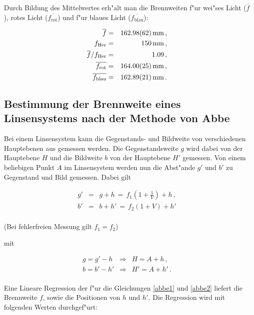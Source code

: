 		\clearpage

		Durch Bildung des Mittelwertes erh"alt man die Brennweiten f"ur wei"ses Licht ($\overline{f}$),
		rotes Licht ($\overline{f_\mathrm{rot}}$) und f"ur blaues Licht ($\overline{f_\mathrm{blau}}$):

		\begin{eqnarray*}
			\overline{f} & = & \SI{162.98 (62)}{\milli \meter} \, , \\
			f_\mathrm{Her} & = & \SI{150}{\milli \meter} \, , \\
			\overline{f}/f_\mathrm{Her} & = & \SI{1.09}{} \, , \\
			\overline{f_\mathrm{rot}} & = & \SI{164.00 (25)}{\milli \meter} \, , \\
			\overline{f_\mathrm{blau}} & = & \SI{162.89 (21)}{\milli \meter} \, .
		\end{eqnarray*}

	\subsection{Bestimmung der Brennweite eines Linsensystems nach der Methode von Abbe}
		\label{subsec:abbe}
		Bei einem Linsensystem kann die Gegenstands- und Bildweite von verschiedenen Hauptebenen aus gemessen werden.
		Die Gegenstandsweite $g$ wird dabei von der Hauptebene $H$ und die Bildweite $b$ von der Hauptebene $H'$ gemessen.
		Von einem beliebigen Punkt $A$ im Linsensystem werden nun die Abst"ande $g'$ und $b'$ zu Gegenstand und Bild gemessen.
		Dabei gilt

		\begin{eqnarray}
			g' & = & g + h \, = \, f_1 \left(1 + \frac{1}{V}\right) + h \, , \label{abbe1}\\
			b' & = & b + h' \, = \, f_2 \left(1 + {V}\right) + h' \label{abbe2}\\
		\end{eqnarray}

		\begin{center}
			\tiny {(Bei fehlerfreien Messung gilt $f_1 = f_2$)}
		\end{center}

		mit

		\begin{eqnarray*}
			g = g' - h & \Rightarrow & H = A + h \, , \\
			b = b' - h' & \Rightarrow & H' = A + h' \, .\\
		\end{eqnarray*}

		Eine Lineare Regression der f"ur die Gleichungen \eqref{abbe1} und \eqref{abbe2} liefert die Brennweite $f$, sowie die Positionen von $h$ und $h'$.
		Die Regression wird mit folgenden Werten durchgef"urt:

